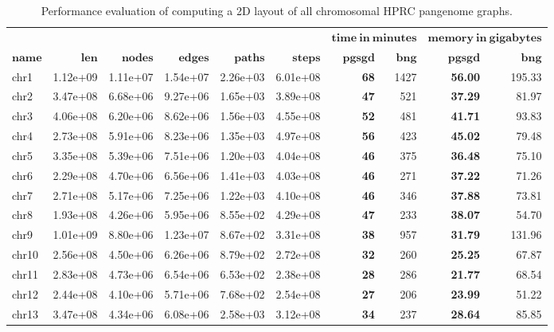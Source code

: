 \begin{table*}[!ht]
	\centering
	\caption{\label{tab:layout} Performance evaluation of computing a 2D layout of all chromosomal HPRC pangenome graphs.}
	\begin{tabular}{@{}lrrrrrrrrr@{}}
		& & & & & &  \multicolumn{2}{c}{$\mathbf{time\ in\ minutes}$}  & \multicolumn{2}{c}{$\mathbf{memory\ in\ gigabytes}$}\\ \cmidrule(lr){7-8} \cmidrule(lr){9-10}
		{$\mathbf{name}$} & {$\mathbf{len}$} & {$\mathbf{nodes}$} & {$\mathbf{edges}$} & {$\mathbf{paths}$} & {$\mathbf{steps}$} & {$\mathbf{pgsgd}$} & {$\mathbf{bng}$} & {$\mathbf{pgsgd}$} & {$\mathbf{bng}$}\\ \hline
		chr1 & 1.12e+09 & 1.11e+07 & 1.54e+07 & 2.26e+03 & 6.01e+08 & \textbf{68} & 1427 & \textbf{56.00} & 195.33 \\ 
		chr2 & 3.47e+08 & 6.68e+06 & 9.27e+06 & 1.65e+03 & 3.89e+08 & \textbf{47} & 521 & \textbf{37.29} & 81.97 \\ 
		chr3 & 4.06e+08 & 6.20e+06 & 8.62e+06 & 1.56e+03 & 4.55e+08 & \textbf{52} & 481 & \textbf{41.71} & 93.83 \\ 
		chr4 & 2.73e+08 & 5.91e+06 & 8.23e+06 & 1.35e+03 & 4.97e+08 & \textbf{56} & 423 & \textbf{45.02} & 79.48 \\ 
		chr5 & 3.35e+08 & 5.39e+06 & 7.51e+06 & 1.20e+03 & 4.04e+08 & \textbf{46} & 375 & \textbf{36.48} & 75.10 \\ 
		chr6 & 2.29e+08 & 4.70e+06 & 6.56e+06 & 1.41e+03 & 4.03e+08 & \textbf{46} & 271 & \textbf{37.22} & 71.26 \\ 
		chr7 & 2.71e+08 & 5.17e+06 & 7.25e+06 & 1.22e+03 & 4.10e+08 & \textbf{46} & 346 & \textbf{37.88} & 73.81 \\ 
		chr8 & 1.93e+08 & 4.26e+06 & 5.95e+06 & 8.55e+02 & 4.29e+08 & \textbf{47} & 233 & \textbf{38.07} & 54.70 \\ 
		chr9 & 1.01e+09 & 8.80e+06 & 1.23e+07 & 8.67e+02 & 3.31e+08 & \textbf{38} & 957 & \textbf{31.79} & 131.96 \\ 
		chr10 & 2.56e+08 & 4.50e+06 & 6.26e+06 & 8.79e+02 & 2.72e+08 & \textbf{32} & 260 & \textbf{25.25} & 67.87 \\ 
		chr11 & 2.83e+08 & 4.73e+06 & 6.54e+06 & 6.53e+02 & 2.38e+08 & \textbf{28} & 286 & \textbf{21.77} & 68.54 \\ 
		chr12 & 2.44e+08 & 4.10e+06 & 5.71e+06 & 7.68e+02 & 2.54e+08 & \textbf{27} & 206 & \textbf{23.99} & 51.22 \\ 
		chr13 & 3.47e+08 & 4.34e+06 & 6.08e+06 & 2.58e+03 & 3.12e+08 & \textbf{34} & 237 & \textbf{28.64} & 85.85 \\ 

\end{tabular}
\end{table*}
